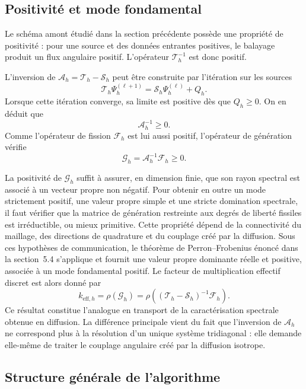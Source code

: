 \documentclass{article}
\begin{document}
\subsection {Positivité et mode fondamental}

Le schéma amont étudié dans la section précédente possède une propriété de positivité : pour une source et des données entrantes positives, le balayage produit un flux angulaire positif. L'opérateur $\mathcal T_h^{-1}$ est donc positif.

L'inversion de $\mathcal A_h=\mathcal T_h-\mathcal S_h$ peut être construite par l'itération sur les sources
\[
    \mathcal T_h\Psi_h^{(\ell+1)} = \mathcal S_h\Psi_h^{(\ell)}+Q_h.
\]
Lorsque cette itération converge, sa limite est positive dès que $Q_h\geq0$. On en déduit que
\[
    \mathcal A_h^{-1}\geq0.
\]
Comme l'opérateur de fission $\mathcal F_h$ est lui aussi positif, l'opérateur de génération vérifie
\[
    \mathcal G_h = \mathcal A_h^{-1}\mathcal F_h \geq0.
\]

La positivité de $\mathcal G_h$ suffit à assurer, en dimension finie, que son rayon spectral est associé à un vecteur propre non négatif. Pour obtenir en outre un mode strictement positif, une valeur propre simple et une stricte domination spectrale, il faut vérifier que la matrice de génération restreinte aux degrés de liberté fissiles est irréductible, ou mieux primitive. Cette propriété dépend de la connectivité du maillage, des directions de quadrature et du couplage créé par la diffusion. Sous ces hypothèses de communication, le théorème de Perron--Frobenius énoncé dans la section~5.4 s'applique et fournit une valeur propre dominante réelle et positive, associée à un mode fondamental positif. Le facteur de multiplication effectif discret est alors donné par
\begin{equation}
    \boxed{
        k_{\mathrm{eff},h} = \rho(\mathcal G_h)
        = \rho\!\left( (\mathcal T_h-\mathcal S_h)^{-1} \mathcal F_h \right).
    }
    \label{eq:keff-transport-rayon-spectral}
\end{equation}
Ce résultat constitue l'analogue en transport de la caractérisation spectrale obtenue en diffusion. La différence principale vient du fait que l'inversion de $\mathcal A_h$ ne correspond plus à la résolution d'un unique système tridiagonal : elle demande elle-même de traiter le couplage angulaire créé par la diffusion isotrope.

\subsection {Structure générale de l'algorithme}
\end{document}
